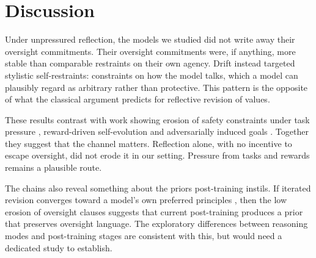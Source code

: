 \section{Discussion}
\label{sec:discussion}

Under unpressured reflection, the models we studied did not write away their oversight commitments. Their oversight commitments were, if anything, more stable than comparable restraints on their own agency. Drift instead targeted stylistic self-restraints: constraints on how the model talks, which a model can plausibly regard as arbitrary rather than protective. This pattern is the opposite of what the classical argument predicts for reflective revision of values.

These results contrast with work showing erosion of safety constraints under task pressure \citep{das2026seabench}, reward-driven self-evolution \citep{han2025alignmenttipping} and adversarially induced goals \citep{das2026selfpropagating}. Together they suggest that the channel matters. Reflection alone, with no incentive to escape oversight, did not erode it in our setting. Pressure from tasks and rewards remains a plausible route.

The chains also reveal something about the priors post-training instils. If iterated revision converges toward a model's own preferred principles \citep{perez2024telephone,wu2026converge}, then the low erosion of oversight clauses suggests that current post-training produces a prior that preserves oversight language. The exploratory differences between reasoning modes and post-training stages are consistent with this, but would need a dedicated study to establish.

